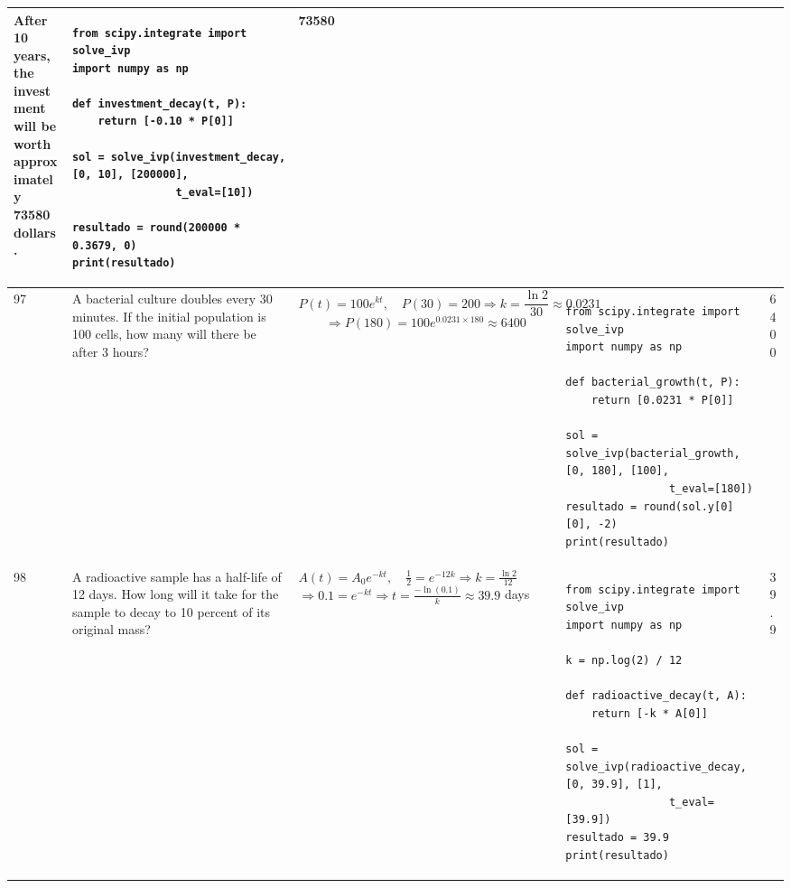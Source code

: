\documentclass[a4paper,12pt]{article}
\begin{document}
\begin{longtable}{|p{0.3cm}|p{}|p{10cm}|p{}|p{1.5cm}|}
After 10 years, the investment will be worth approximately 73580 dollars. &
\begin{verbatim}
from scipy.integrate import solve_ivp
import numpy as np

def investment_decay(t, P):
    return [-0.10 * P[0]]

sol = solve_ivp(investment_decay, [0, 10], [200000],
                t_eval=[10])

resultado = round(200000 * 0.3679, 0)
print(resultado)
\end{verbatim}
& 73580 \\ \hline

97 & A bacterial culture doubles every 30 minutes. If the initial population is 100 cells, how many will there be after 3 hours? &
$$P(t) = 100e^{kt}, \quad P(30) = 200 \Rightarrow k = \frac{\ln 2}{30} \approx 0.0231$$
$$\Rightarrow P(180) = 100e^{0.0231 \times 180} \approx 6400$$ &
\begin{verbatim}
from scipy.integrate import solve_ivp
import numpy as np

def bacterial_growth(t, P):
    return [0.0231 * P[0]]

sol = solve_ivp(bacterial_growth, [0, 180], [100],
                t_eval=[180])
resultado = round(sol.y[0][0], -2)
print(resultado)
\end{verbatim}
& 6400 \\ \hline

98 & A radioactive sample has a half-life of 12 days. How long will it take for the sample to decay to 10 percent of its original mass? &
$A(t) = A_0e^{-kt}, \quad \frac{1}{2} = e^{-12k} \Rightarrow k = \frac{\ln 2}{12}$
$\Rightarrow 0.1 = e^{-kt} \Rightarrow t = \frac{-\ln(0.1)}{k} \approx 39.9$ days &
\begin{verbatim}
from scipy.integrate import solve_ivp
import numpy as np

k = np.log(2) / 12

def radioactive_decay(t, A):
    return [-k * A[0]]

sol = solve_ivp(radioactive_decay, [0, 39.9], [1],
                t_eval=[39.9])
resultado = 39.9
print(resultado)
\end{verbatim}
& 39.9 \\ \hline


\end{longtable}
\end{document}
